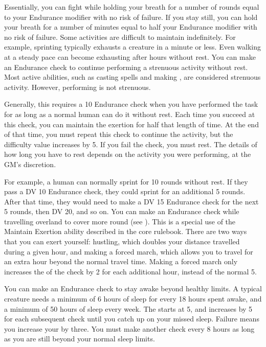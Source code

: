     Essentially, you can fight while holding your breath for a number of rounds equal to your Endurance modifier with no risk of failure.
    If you stay still, you can hold your breath for a number of minutes equal to half your Endurance modifier with no risk of failure.
    Some activities are difficult to maintain indefinitely.
    For example, sprinting typically exhausts a creature in a minute or less.
    Even walking at a steady pace can become exhausting after hours without rest.
    You can make an Endurance check to continue performing a strenuous activity without rest.
    Most active abilities, such as casting spells and making , are considered strenuous activity.
    However, performing  is not strenuous.

    Generally, this requires a  10 Endurance check when you have performed the task for as long as a normal human can do it without rest.
    Each time you succeed at this check, you can maintain the exertion for half that length of time.
    At the end of that time, you must repeat this check to continue the activity, but the difficulty value increases by 5.
    If you fail the check, you must rest.
    The details of how long you have to rest depends on the activity you were performing, at the GM's discretion.

    For example, a human can normally sprint for 10 rounds without rest.
    If they pass a DV 10 Endurance check, they could sprint for an additional 5 rounds.
    After that time, they would need to make a DV 15 Endurance check for the next 5 rounds, then DV 20, and so on.
     You can make an Endurance check while travelling overland to cover more round (see ).
    This is a special use of the Maintain Exertion ability described in the core rulebook.
    There are two ways that you can exert yourself: hustling, which doubles your distance travelled during a given hour, and making a forced march, which allows you to travel for an extra hour beyond the normal travel time.
    Making a forced march only increases the  of the check by 2 for each additional hour, instead of the normal 5.

     You can make an Endurance check to stay awake beyond healthy limits.
    A typical creature needs a minimum of 6 hours of sleep for every 18 hours spent awake, and a minimum of 50 hours of sleep every week.
    The  starts at 5, and increases by 5 for each subsequent check until you catch up on your missed sleep.
    Failure means you increase your  by three.
    You must make another check every 8 hours as long as you are still beyond your normal sleep limits.

